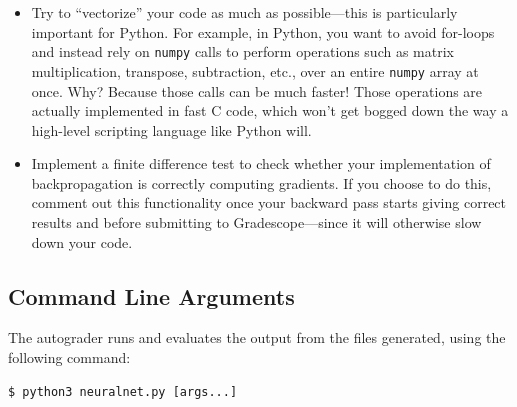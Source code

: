 \documentclass[11pt,addpoints,answers]{exam}
\begin{document}
\begin{itemize}
\item Try to ``vectorize'' your code as much as possible---this is particularly important for Python. For example, in Python, you want to avoid for-loops and instead rely on \lstinline{numpy} calls to perform operations such as matrix multiplication, transpose, subtraction, etc., over an entire \lstinline{numpy} array at once. Why? Because those calls can be much faster! Those operations are actually implemented in fast C code, which won't get bogged down the way a high-level scripting language like Python will.
\item Implement a finite difference test to check whether your implementation of backpropagation is correctly computing gradients. If you choose to do this, comment out this functionality once your backward pass starts giving correct results and before submitting to Gradescope---since it will otherwise slow down your code.
\end{itemize}

\subsection{Command Line Arguments}
\label{sec:args}
The autograder runs and evaluates the output from the files generated, using the following command:

\begin{lstlisting}[language=Shell]
$ python3 neuralnet.py [args...]
\end{lstlisting}
\end{document}
